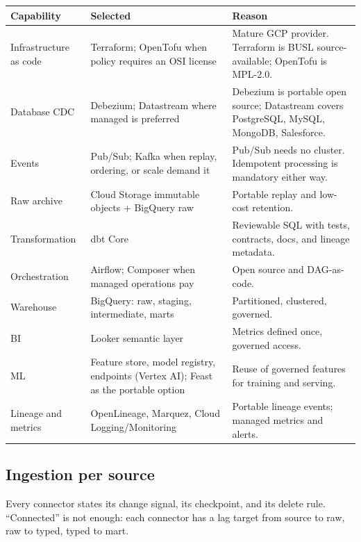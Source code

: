 \documentclass[10pt,a4paper]{article}
\begin{document}
{\small
\begin{tabularx}{\textwidth}{L{30mm}L{52mm}Y}
\toprule
\textbf{Capability} & \textbf{Selected} & \textbf{Reason} \\
\midrule
Infrastructure as code & Terraform; OpenTofu when policy requires an OSI license & Mature GCP provider. Terraform is BUSL source-available; OpenTofu is MPL-2.0.\cite{tfLicense,openTofuLicense} \\
Database CDC & Debezium; Datastream where managed is preferred & Debezium is portable open source; Datastream covers PostgreSQL, MySQL, MongoDB, Salesforce.\cite{debezium,gcDatastream} \\
Events & Pub/Sub; Kafka when replay, ordering, or scale demand it & Pub/Sub needs no cluster. Idempotent processing is mandatory either way.\cite{gcPubSubExactly} \\
Raw archive & Cloud Storage immutable objects + BigQuery raw & Portable replay and low-cost retention. \\
Transformation & dbt Core & Reviewable SQL with tests, contracts, docs, and lineage metadata.\cite{dbtLicense} \\
Orchestration & Airflow; Composer when managed operations pay & Open source and DAG-as-code.\cite{airflowLicense} \\
Warehouse & BigQuery: raw, staging, intermediate, marts & Partitioned, clustered, governed. \\
BI & Looker semantic layer & Metrics defined once, governed access.\cite{gcLookML,gcLookerAccess} \\
ML & Feature store, model registry, endpoints (Vertex AI); Feast as the portable option & Reuse of governed features for training and serving.\cite{gcFeatureStore,feast} \\
Lineage and metrics & OpenLineage, Marquez, Cloud Logging/Monitoring & Portable lineage events; managed metrics and alerts.\cite{marquezLicense} \\
\bottomrule
\end{tabularx}
}

\subsection{Ingestion per source}

Every connector states its change signal, its checkpoint, and its
delete rule. ``Connected'' is not enough: each connector has a lag target
from source to raw, raw to typed, typed to mart.
\end{document}
